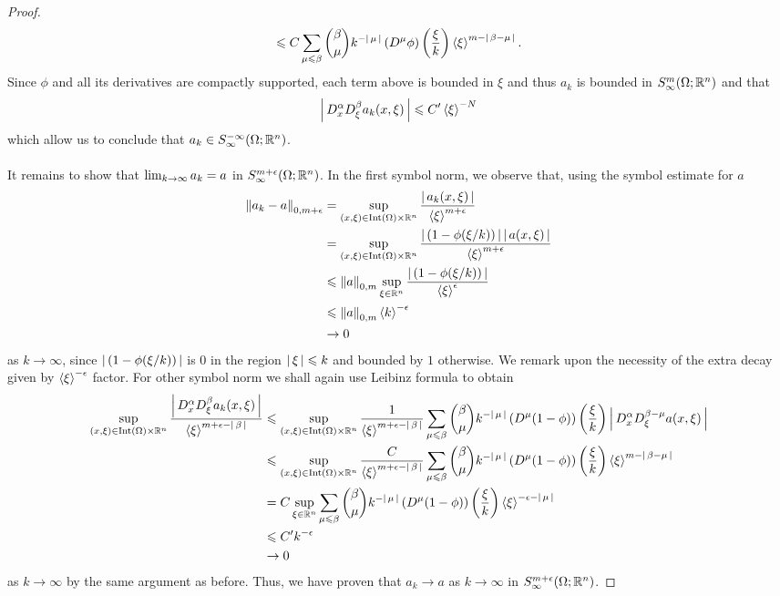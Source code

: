 \documentclass[12pt]{article}
\begin{document}
\begin{proof}
\[     \leq C \sum_{\mu \leq \beta} \binom{\beta}{\mu}k^{-\abs{\mu}} \brac{D^\mu \phi}\brac{\frac{\xi}{k}} \sym[\xi]^{m - \abs{\beta - \mu}}. 
     \] 
     Since $\phi$ and all its derivatives are compactly supported, each term above is bounded in $\xi$ and thus $a_k$ is bounded in $S^{m}_\infty(\Omega; \R^n)$ and that 
     \[
     \abs{D^\alpha_x D^\beta_\xi a_k(x, \xi)} \leq C' \sym[\xi]^{-N}
     \]
     which allow us to conclude that $a_k \in S^{-\infty}_\infty(\Omega; \R^n)$.\\
     \\
     It remains to show that $\Lim[k] a_k = a $ in $S^{m + \epsilon}_\infty(\Omega; \R^n)$. In the first symbol norm, we observe that, using the symbol estimate for $a$ 
     \begin{align*}
     \norm[a_k - a]_{0, m + \epsilon} 
     & = \sup_{(x, \xi) \in \mathrm{Int}(\Omega) \times \R^n} \frac{\abs{a_k(x, \xi)}}{\sym[\xi]^{m + \epsilon}} \\
     & = \sup_{(x, \xi) \in \mathrm{Int}(\Omega) \times \R^n} \frac{\abs{(1- \phi(\xi/k))} \abs{a(x, \xi)}}{\sym[\xi]^{m + \epsilon}} \\
     & \leq \norm[a]_{0, m} \sup_{\xi \in \R^n} \frac{\abs{(1- \phi(\xi/k))}}{\sym[\xi]^{\epsilon}} \\
     & \leq \norm[a]_{0, m} \sym[k]^{- \epsilon}\\
     & \to 0
     \end{align*}
     as $k \to \infty$, since $\abs{( 1- \phi(\xi/ k))}$ is 0 in the region $\abs{\xi} \leq k$ and bounded by $1$ otherwise.  We remark upon the necessity of the extra decay given by $\sym[\xi]^{-\epsilon}$ factor. For other symbol norm we shall again use Leibinz formula to obtain 
     \begin{align*}
     \sup_{(x, \xi) \in \mathrm{Int}(\Omega) \times \R^n} \frac{\abs{D^\alpha_x D^\beta_\xi a_k(x, \xi)}}{\sym[\xi]^{m + \epsilon - \abs{\beta}}} 
     & \leq \sup_{(x, \xi) \in \mathrm{Int}(\Omega) \times \R^n} \frac{1}{\sym[\xi]^{m + \epsilon - \abs{\beta}}} \sum_{\mu \leq \beta} \binom{\beta}{\mu}k^{-\abs{\mu}} \brac{D^\mu (1 - \phi)}\brac{\frac{\xi}{k}} \abs{D^\alpha_x D^{\beta - \mu}_\xi a(x, \xi) } \\
     & \leq  \sup_{(x, \xi) \in \mathrm{Int}(\Omega) \times \R^n} \frac{C}{\sym[\xi]^{m + \epsilon - \abs{\beta}}} \sum_{\mu \leq \beta} \binom{\beta}{\mu}k^{-\abs{\mu}} \brac{D^\mu (1 - \phi)}\brac{\frac{\xi}{k}} \sym[\xi]^{m - \abs{\beta - \mu}}  \\
     & = C \sup_{\xi \in \R^n} \sum_{\mu \leq \beta} \binom{\beta}{\mu}k^{-\abs{\mu}} \brac{D^\mu (1 - \phi)}\brac{\frac{\xi}{k}} \sym[\xi]^{- \epsilon - \abs{\mu}}  \\
     & \leq C' k^{- \epsilon} \\
     & \to 0
     \end{align*}
     as $k \to \infty$ by the same argument as before. Thus, we have proven that $a_k \to a$ as $k \to \infty$ in $S^{m + \epsilon}_\infty(\Omega; \R^n)$. 
    
\end{proof}
\end{document}
